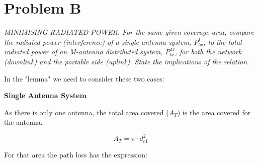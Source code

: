 \section{Problem B}

\textit{MINIMISING RADIATED POWER. For the same given coverage area, compare the radiated power (interference) of a single antenna system, $P_{tx}^1$, to the total radiated power of an M-antenna distributed system, $P_{tx}^M$, for both the network (downlink) and the portable side (uplink). State the implications of the relation.}

In the "lemma" we need to consider these two cases:

\textbf{Single Antenna System}

As there is only one antenna, the total area covered ($A_{T}$) is the area covered for the antenna.

\begin{equation}
A_{T} = \pi \cdot d_{c1}^{2}
\end{equation}

For that area the path loss has the expression:



 